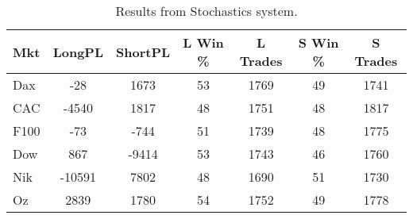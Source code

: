 \begin{table}[ht]
\centering
\caption[Stochastics system]{Results from Stochastics system.} 
\label{tab:stoch_results}
\begin{tabular}{lcccccc}
  \toprule Mkt & LongPL & ShortPL & L Win \% & L Trades & S Win \% & S Trades \\ 
  \midrule Dax & -28 & 1673 & 53 & 1769 & 49 & 1741 \\ 
  CAC & -4540 & 1817 & 48 & 1751 & 48 & 1817 \\ 
  F100 & -73 & -744 & 51 & 1739 & 48 & 1775 \\ 
  Dow & 867 & -9414 & 53 & 1743 & 46 & 1760 \\ 
  Nik & -10591 & 7802 & 48 & 1690 & 51 & 1730 \\ 
  Oz & 2839 & 1780 & 54 & 1752 & 49 & 1778 \\ 
   \bottomrule \end{tabular}
\end{table}
